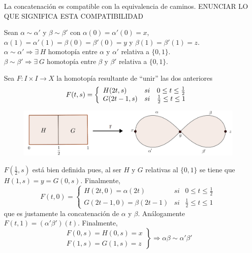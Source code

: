 \documentclass[bibtex, anon]{TEMat-article}
\begin{document}
\begin{lema} La concatenación es compatible con la equivalencia de caminos. ENUNCIAR LO QUE SIGNIFICA ESTA COMPATIBILIDAD
\end{lema}
\begin{demostracion}
	Sean $\alpha\sim\alpha'$ y $\beta\sim\beta'$ con $\alpha(0)=\alpha'(0)=x$, $\alpha(1)=\alpha'(1)=\beta(0)=\beta'(0)=y$ y $\beta(1)=\beta'(1)=z$.\\
	$\alpha\sim\alpha'\Rightarrow\exists\ H$ homotopía entre $\alpha$ y $\alpha'$ relativa a $\{0,1\}$.\\
	$\beta\sim\beta'\Rightarrow\exists\ G$ homotopía entre $\beta$ y $\beta'$ relativa a $\{0,1\}$.
	
	Sea $F:I\times I\to X$ la homotopía resultante de ``unir'' las dos anteriores
	\[
	F(t,s)=\left\{\begin{array}{l c c}
	H(2t,s) & si & 0\leq t\leq\frac{1}{2}\\
	G(2t-1,s) & si &\frac{1}{2}\leq t\leq 1
	
	\end{array}\right.
	\]
	\begin{figure}[h!]
		\centering
		\includegraphics[scale=0.28]{Imagenes/yuxta}
	\end{figure}
	
	$F(\frac{1}{2},s)$ está bien definida pues, al ser $H$ y $G$ relativas al $\{0,1\}$ se tiene que $H(1,s)=y=G(0,s)$. Finalmente,
	\[
	F(t,0)=\left\{\begin{array}{lcc}
	H(2t,0)=\alpha(2t) & si & 0\leq t\leq\frac{1}{2}\\
	G(2t-1,0)=\beta(2t-1) & si & \frac{1}{2}\leq t\leq 1
	\end{array}\right.
	\]
	que es justamente la concatenación de $\alpha$ y $\beta$. Análogamente $F(t,1)=(\alpha'\beta')(t)$. Finalmente,
	\[
	\left.\begin{array}{c}
	F(0,s)=H(0,s)=x\\
	F(1,s)=G(1,s)=z
	\end{array}\right\}\Rightarrow \alpha\beta\sim\alpha'\beta'
	\]
	
\end{demostracion}
\end{document}
